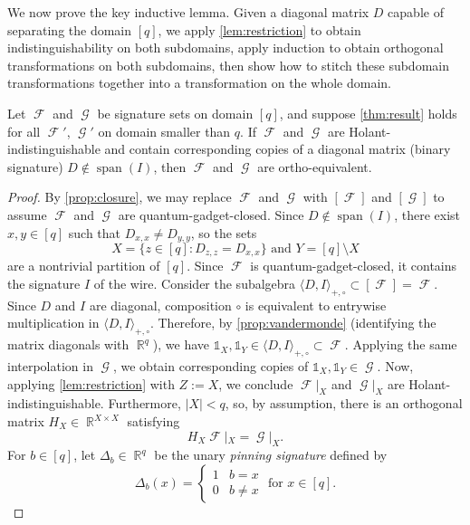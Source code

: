 \documentclass{article}
\DeclareMathOperator{\spn}{span}
\DeclareMathOperator{\rr}{\mathbb{R}}
\DeclareMathOperator{\fc}{\mathcal{F}}
\DeclareMathOperator{\gc}{\mathcal{G}}
\begin{document}
We now prove the key inductive lemma. Given a diagonal matrix $D$ capable of separating the
domain $[q]$, we apply \autoref{lem:restriction} to obtain indistinguishability on both
subdomains, apply induction to obtain orthogonal transformations on both subdomains, then
show how to stitch these subdomain transformations together into a transformation on the
whole domain.
\begin{lemma}
    \label{lem:induction}
    Let $\fc$ and $\gc$ be signature sets on domain $[q]$, and suppose \autoref{thm:result} holds for
    all $\fc'$, $\gc'$ on domain smaller than $q$. If $\fc$ and $\gc$ are Holant-indistinguishable
    and contain corresponding copies of a diagonal matrix (binary signature)
    $D \not\in \spn(I)$, then $\fc$ and $\gc$ are ortho-equivalent. 
\end{lemma}
\begin{proof}
    By \autoref{prop:closure}, we may replace $\fc$ and $\gc$ with $[\fc]$ and $[\gc]$ to assume $\fc$
    and $\gc$ are quantum-gadget-closed.
    Since $D \not\in \spn(I)$, there exist $x,y \in [q]$ such that $D_{x,x} \neq D_{y,y}$,
    so the sets 
    \[
        X = \{z \in [q]: D_{z,z} = D_{x,x}\} \text{ and } Y = [q] \setminus X
    \]
    are a nontrivial partition of $[q]$. Since $\fc$ is quantum-gadget-closed, it contains 
    the signature $I$ of the wire. 
    Consider the subalgebra $\langle D,I\rangle_{+,\circ} \subset [\fc] = \fc$.
    Since $D$ and $I$ are diagonal, composition $\circ$ is equivalent to entrywise multiplication
    in $\langle D,I\rangle_{+,\circ}$. Therefore, by \autoref{prop:vandermonde} (identifying the
    matrix diagonals with $\rr^q$),
    we have $\mathds{1}_X, \mathds{1}_Y \in\langle D,I\rangle_{+,\circ} \subset \fc$.
    Applying the same interpolation in $\gc$, we obtain corresponding copies of 
    $\mathds{1}_X, \mathds{1}_Y \in \gc$. 
    Now, applying \autoref{lem:restriction} with $Z := X$, we conclude
    $\fc|_X$ and $\gc|_X$ are Holant-indistinguishable. Furthermore, $|X| < q$, so, by assumption,
    there is an orthogonal matrix $H_X \in \rr^{X \times X}$ satisfying 
    \begin{equation}
        H_X \fc|_X = \gc|_X.
        \label{eq:hx}
    \end{equation}
    For $b \in [q]$, let $\Delta_b \in \rr^q$ be the unary \emph{pinning signature} defined by
   \[\Delta_b(x) = 
      \begin{cases} 1 & b = x \\ 0 & b \neq x \end{cases} \text{ for } x \in [q].
\]
\end{proof}
\end{document}
